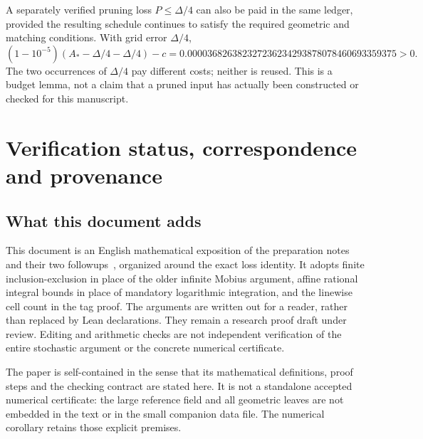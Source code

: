 A separately verified pruning loss \(P\le\Delta/4\) can also be
paid in the same ledger, provided the resulting schedule continues
to satisfy the required geometric and matching conditions. With
grid error \(\Delta/4\),
\[
 (1-10^{-5})(A_* -\Delta/4-\Delta/4)-c
 =0.000036826382327236234293878078460693359375>0.
\]
The two occurrences of \(\Delta/4\) pay different costs; neither
is reused. This is a budget lemma, not a claim that a pruned input
has actually been constructed or checked for this manuscript.

\section{Verification status, correspondence and provenance}\label{sec:status}

\subsection{What this document adds}
This document is an English mathematical exposition of the preparation
notes and their two followups~\cite{preparation,followup,second},
organized around the exact loss identity.
It adopts finite inclusion-exclusion in place of the older infinite
Mobius argument, affine rational integral bounds in place of mandatory
logarithmic integration, and the linewise cell count in the tag proof.
The arguments are written out for a reader, rather than replaced by
Lean declarations. They remain a research proof draft under review.
Editing and arithmetic checks are not independent verification of the
entire stochastic argument or the concrete numerical certificate.

The paper is self-contained in the sense that its mathematical
definitions, proof steps and the checking contract are stated here.
It is not a standalone accepted numerical certificate: the large
reference field and all geometric leaves are not embedded in the
text or in the small companion data file. The numerical corollary
retains those explicit premises.

